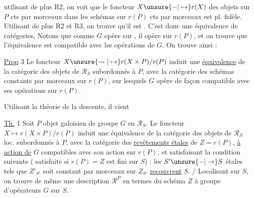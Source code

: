  utilisant de plus R2, on voit que le foncteur $X\unsure{-|\mapsto}r(X)$ des  objets sur $P$ cts par morceaux dans les schémas sur $r(P)$ cts par morceaux est pl. fidèle. Utilisant de plus R2 et R3, on trouve qu'il est . C'est donc une équivalence de catégories,
 Notons que comme $G$ opère sur , il opère sur $r(P)$,  et on trouve que l'équivalence est compatible avec les opérations de $G$. On trouve ainsi :

\uline{Prop} 3 
Le foncteur $X\unsure{\leadsto|\mapsto}r(X\times P)/r(P)$ induit une \uline{équivalence} de la catégorie des objets de $\mathscr R_S$ subordonnés à $P$, avec la catégorie des schémas  constants par morceaux sur $r(P)$, sur lesquels $G$ opère de façon compatible avec ses opérations sur $r(P)$.

Utilisant la théorie de la descente, il vient

\uline{Th.} 1 Soit $P$ objet galoisien de groupe $G$ en $\mathscr R_S$. Le foncteur $X\longmapsto r(X\times P)/r(P)$ induit une équivalence de la catégorie des objets de $\mathscr R_S$ loc. subordonnés à $P$, avec la catégorie des \uline{revêtements étales}  de $Z=r(P)$, \uline{à action de} $G$ compatibles avec son action sur $r(P)$, et satisfaisant la condition suivante ( satisfaite si $r(P)=Z$ est fini sur $S$) : les $S'\unsure{-|\to}S$ étales tels que $Z'_{S'}$ soit  constant par morceaux sur $Z_{S'}$ \uline{recouvrent} $S$. / Localisant sur $S$, on trouve de même une description  $\mathscr R^P$ en termes du schéma $Z$ à groupe d'opérateurs $G$ sur $S$.
